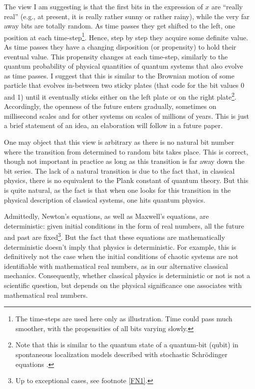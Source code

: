 \documentclass[pra,aps,groupedaddress,twocolumn,floatfix,nofootinbib]{revtex4}
\begin{document}
The view I am suggesting is that the first bits in the expression of $x$ are ``really real'' (e.g., at present, it is really rather sunny or rather rainy), while the very far away bits are totally random. As time passes they get shifted to the left, one position at each time-step\footnote{The time-steps are used here only as illustration. Time could pass much smoother, with the propensities of all bits varying slowly.}. Hence, step by step they acquire some definite value. As time passes they have a changing disposition (or propensity) \cite{Dorato11} to hold their eventual value. This propensity changes at each time-step, similarly to the quantum probability of physical quantities of quantum systems that also evolve as time passes. I suggest that this is similar to the Brownian motion of some particle that evolves in-between two sticky plates (that code for the bit values 0 and 1) until it eventually sticks either on the left plate or on the right plate\footnote{Note that this is similar to the quantum state of a quantum-bit (qubit) in spontaneous localization models described with stochastic Schr\"odinger equations \cite{QSD}.}. Accordingly, the openness of the future enters gradually, sometimes on millisecond scales and for other systems on scales of millions of years. This is just a brief statement of an idea, an elaboration will follow in a future paper.

One may object that this view is arbitrary as there is no natural bit number where the transition from determined to random bits takes place. This is correct, though not important in practice as long as this transition is far away down the bit series. The lack of a natural transition is due to the fact that, in classical physics, there is no equivalent to the Plank constant of quantum theory. But this is quite natural, as the fact is that when one looks for this transition in the physical description of classical systems, one hits quantum physics. 

Admittedly, Newton's equations, as well as Maxwell's equations, are deterministic: given initial conditions in the form of real numbers, all the future and past are fixed\footnote{Up to exceptional cases, see footnote \ref{FN1}.}. But the fact that these equations are mathematically deterministic doesn't imply that physics is deterministic. For example, this is definitively not the case when the initial conditions of chaotic systems are not identifiable with mathematical real numbers, as in our alternative classical mechanics. Consequently, whether classical physics is deterministic or not is not a scientific question, but depends on the physical significance one associates with mathematical real numbers.
\end{document}

